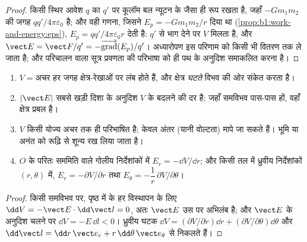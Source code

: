 \begin{proof}
किसी स्थिर आवेश $q$ का $q'$ पर कूलॉम बल न्यूटन के  जैसा ही रूप
रखता है, जहाँ $-Gm_1m_2$ की जगह $qq'/4\pi\varepsilon_0$ है; और वही
गणना, जिसने $E_p = -Gm_1m_2/r$ दिया था
(\cref{prop:b1:work-and-energy:eps}), $E_p = qq'/4\pi\varepsilon_0r$ देती है:
$q'$ से भाग देने पर $V$ मिलता है, और $\vect E = \vect F/q' =
-\overrightarrow{\operatorname{grad}}(E_p)/q'$। अध्यारोपण इस परिणाम को किसी
भी वितरण तक ले जाता है; और परिचालन वाला सूत्र प्रवणता की परिभाषा को ही पथ
के अनुदिश समाकलित करना है।
\end{proof}

\begin{proposition}[किसी विभव को पढ़ना]\label{prop:b1:potential-capacitors:reading}
\begin{enumerate}
  \item \emph{} $V = \text{अचर}$ हर जगह क्षेत्र-रेखाओं पर लंब
        होते हैं, और क्षेत्र \emph{घटते} विभव की ओर संकेत करता है।
  \item $|\vect E|$ सबसे खड़ी दिशा के अनुदिश $V$ के बदलने की दर है: जहाँ
        समविभव पास-पास हों, वहाँ क्षेत्र प्रबल है।
  \item $V$ किसी योज्य अचर तक ही परिभाषित है; केवल अंतर (यानी वोल्टता)
        मापे जा सकते हैं। भूमि या अनंत को रूढ़ि से शून्य रख लिया जाता
        है।
  \item $O$ के परितः सममिति वाले गोलीय निर्देशांकों में $E_r = -\dd V/
        \dd r$; और किसी तल में ध्रुवीय निर्देशांकों $(r, \theta)$ में,
        $E_r = -\partial V/\partial r$ तथा $E_\theta = -\dfrac1r\,\partial V/\partial\theta$।
\end{enumerate}
\end{proposition}

\begin{proof}
किसी समविभव पर, पृष्ठ में के हर विस्थापन के लिए $\dd V = -\vect E\cdot\dd\vect l = 0$,
अतः $\vect E$ उस पर अभिलंब है; और $\vect E$ के अनुदिश चलने पर
$\dd V = -E\,\dd l < 0$। ध्रुवीय घटक
$\dd V = (\partial V/\partial r)\dd r + (\partial V/\partial\theta)\dd\theta$ और
$\dd\vect l = \dd r\,\vect e_r + r\,\dd\theta\,\vect e_\theta$ से निकलते हैं।
\end{proof}

